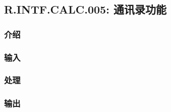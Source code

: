 \subsection{R.INTF.CALC.005: 通讯录功能}
\subsubsection{介绍}
\subsubsection{输入}
\subsubsection{处理}
\subsubsection{输出}
